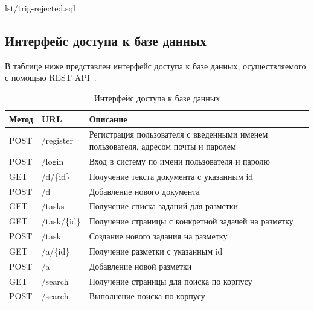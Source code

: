 \begin{code}
    \begin{lstinputlisting}[
            label={lst:test:trig:rejected},
            caption={Уменьшение уровня доверия пользователя при отклонении его разметки},
        ]{lst/trig-rejected.sql}
    \end{lstinputlisting}
\end{code}

\subsection{Интерфейс доступа к базе данных}

В таблице ниже представлен интерфейс доступа к базе данных, осуществляемого с помощью REST API~\cite{restapi}.

\begin{table}[H]
\centering
\caption{Интерфейс доступа к базе данных}
\begin{tabular}{|m{2cm}|m{2.5cm}|m{10.5cm}|}
\hline
    \textbf{Метод} & \textbf{URL} & \textbf{Описание} \\ \hline
    POST & /register & Регистрация пользователя с введенными именем пользователя, адресом почты и паролем \\ \hline
    POST & /login & Вход в систему по имени пользователя и паролю \\ \hline
    GET & /d/\{id\} & Получение текста документа с указанным id \\ \hline
    POST & /d & Добавление нового документа \\ \hline
    GET & /tasks & Получение списка заданий для разметки \\ \hline
    GET & /task/\{id\} & Получение страницы с конкретной задачей на разметку \\ \hline
    POST & /task & Создание нового задания на разметку \\ \hline
    GET & /a/\{id\} & Получение разметки с указанным id \\ \hline
    POST & /a & Добавление новой разметки \\ \hline
    GET & /search & Получение страницы для поиска по корпусу \\ \hline
    POST & /search & Выполнение поиска по корпусу \\ \hline
\end{tabular}
\label{tab:api}
\end{table}

